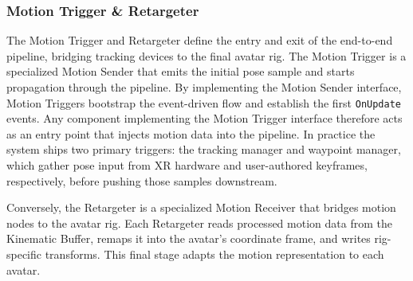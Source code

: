 \subsubsection{Motion Trigger \& Retargeter}
The Motion Trigger and Retargeter define the entry and exit of the end-to-end pipeline, bridging tracking devices to the final avatar rig.
The Motion Trigger is a specialized Motion Sender that emits the initial pose sample and starts propagation through the pipeline. 
By implementing the Motion Sender interface, Motion Triggers bootstrap the event-driven flow and establish the first \texttt{OnUpdate} events.
Any component implementing the Motion Trigger interface therefore acts as an entry point that injects motion data into the pipeline.
In practice the system ships two primary triggers: the tracking manager and waypoint manager, which gather pose input from XR hardware and user-authored keyframes, respectively, before pushing those samples downstream.

Conversely, the Retargeter is a specialized Motion Receiver that bridges motion nodes to the avatar rig.
Each Retargeter reads processed motion data from the Kinematic Buffer, remaps it into the avatar's coordinate frame, and writes rig-specific transforms.
This final stage adapts the motion representation to each avatar.